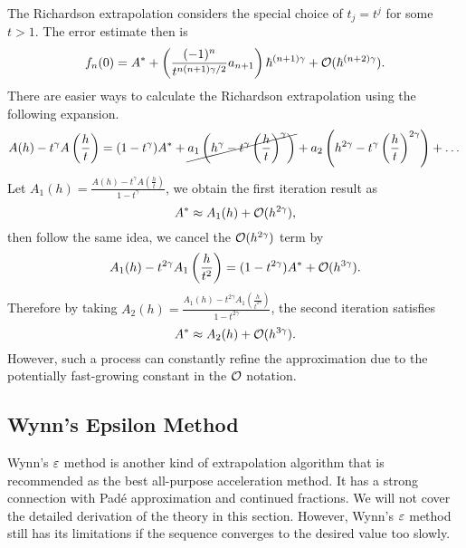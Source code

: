 The Richardson extrapolation considers the special choice of $t_j = t^j$ for some $t > 1$. The error estimate then is 
\begin{equation}
    f_n(0) = A^{\ast} + \left(\frac{(-1)^n}{t^{n(n+1)\gamma/2}} a_{n+1}\right) \hbar^{(n+1)\gamma} + \mathcal O(\hbar^{(n+2)\gamma}).
\end{equation}
There are easier ways to calculate the Richardson extrapolation using the following expansion.
\begin{equation}
    A(h) - t^{\gamma} A\left(\frac{h}{t}\right) = (1 - t^{\gamma}) A^{\ast} + \cancel{a_1 \left(h^{\gamma} - t^{\gamma} \left(\frac{h}{t}\right)^{\gamma}\right)} + a_2\left(h^{2\gamma} - t^{\gamma}\left(\frac{h}{t}\right)^{2\gamma}\right) +\dots
\end{equation}
Let $A_1(h) = \frac{A(h) - t^{\gamma} A(\frac{h}{t}) }{1 - t^{\gamma}} $, we obtain the first iteration result as 
\begin{equation}
    A^{\ast} \approx A_1(h) + \mathcal O(h^{2\gamma}),
\end{equation}
then follow the same idea, we cancel the $\mathcal O(h^{2\gamma})$ term by
\begin{equation}
    A_1(h) - t^{2\gamma} A_1\left(\frac{h}{t^2}\right) = (1 - t^{2\gamma}) A^{\ast} + \mathcal O(h^{3\gamma}).
\end{equation}
Therefore by taking $A_2(h) = \frac{A_1(h)- t^{2\gamma} A_1(\frac{h}{t^{2\gamma}})}{1 - t^{2\gamma}}$, the second iteration satisfies 
\begin{equation}
    A^{\ast}\approx A_2(h) + \mathcal O(h^{3\gamma}).
\end{equation}
However, such a process can constantly refine the approximation due to the potentially fast-growing constant in the $\mathcal O$ notation.

\subsection{Wynn's Epsilon Method}
\label{SSec: 3-Wynn-Eps-Met}
Wynn's $\varepsilon$ method is another kind of extrapolation algorithm that is recommended as the best all-purpose acceleration method. It has a strong connection with Pad\'e approximation and continued fractions. We will not cover the detailed derivation of the theory in this section. However, Wynn's $\varepsilon$ method still has its limitations if the sequence converges to the desired value too slowly. 


